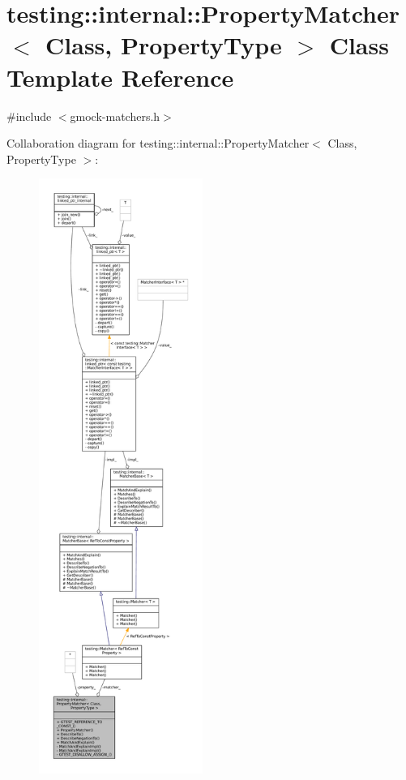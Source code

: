 \hypertarget{classtesting_1_1internal_1_1PropertyMatcher}{}\section{testing\+:\+:internal\+:\+:Property\+Matcher$<$ Class, Property\+Type $>$ Class Template Reference}
\label{classtesting_1_1internal_1_1PropertyMatcher}


{\ttfamily \#include $<$gmock-\/matchers.\+h$>$}



Collaboration diagram for testing\+:\+:internal\+:\+:Property\+Matcher$<$ Class, Property\+Type $>$\+:
\nopagebreak
\begin{figure}[H]
\begin{center}
\leavevmode
\includegraphics[height=550pt]{classtesting_1_1internal_1_1PropertyMatcher__coll__graph}
\end{center}
\end{figure}
